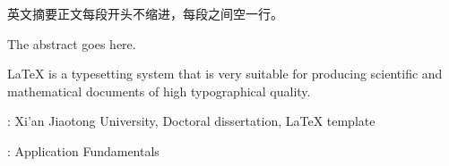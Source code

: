 \noindent 英文摘要正文每段开头不缩进，每段之间空一行。\newline

\noindent The abstract goes here. \newline

\noindent \LaTeX{} is a typesetting system that is very suitable for producing scientific and mathematical documents of high typographical quality.


\vspace{\baselineskip}
: Xi'an Jiaotong University, Doctoral dissertation, \LaTeX{} template

\vspace{\baselineskip}
: Application Fundamentals

\clearpage
